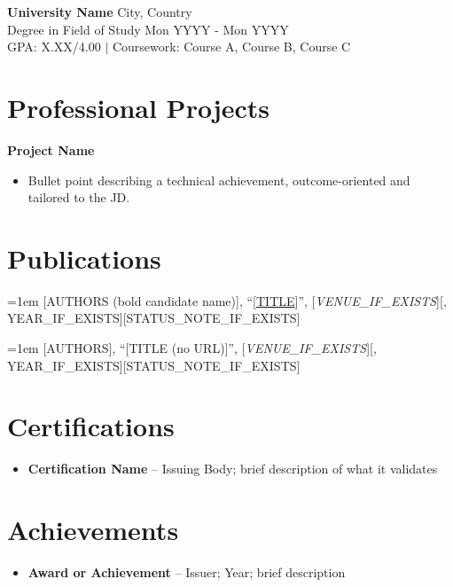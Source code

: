 \documentclass[9pt,letterpaper]{article}
\begin{document}
\noindent
\textbf{University Name} \hfill City, Country \\
Degree in Field of Study \hfill Mon YYYY - Mon YYYY \\
GPA: X.XX/4.00 $|$ Coursework: Course A, Course B, Course C \\

\section*{Professional Projects}
\noindent
\textbf{Project Name}
\begin{itemize}
    \item Bullet point describing a technical achievement, outcome-oriented and tailored to the JD.
\end{itemize}

\section*{Publications}
\noindent\hangindent=1em [AUTHORS (bold candidate name)], ``[\href{PAPER_URL_IF_EXISTS}{TITLE}]'', [\textit{VENUE\_IF\_EXISTS}][, YEAR\_IF\_EXISTS][STATUS\_NOTE\_IF\_EXISTS]
\vspace{3pt}

\noindent\hangindent=1em [AUTHORS], ``[TITLE (no URL)]'', [\textit{VENUE\_IF\_EXISTS}][, YEAR\_IF\_EXISTS][STATUS\_NOTE\_IF\_EXISTS]

\section*{Certifications}
\begin{itemize}
    \item \textbf{Certification Name} -- Issuing Body; brief description of what it validates
\end{itemize}

\section*{Achievements}
\begin{itemize}
    \item \textbf{Award or Achievement} -- Issuer; Year; brief description
\end{itemize}
\end{document}
